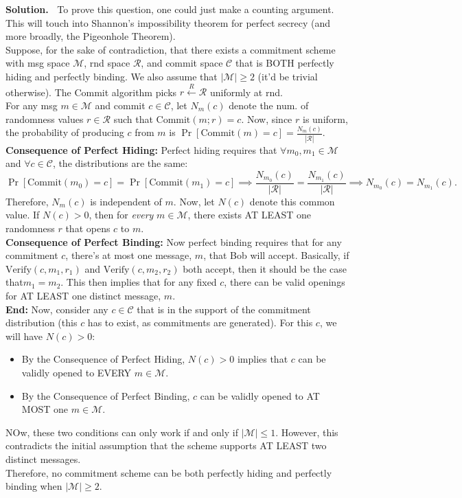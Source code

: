 \documentclass[12pt]{article}
\theoremstyle{definition}
\newcommand{\addbigskip}{\addvspace{\bigskipamount}}
\newenvironment{solution}
     {\addbigskip
      \noindent\color{blue}\textbf{Solution.\ }}
     {\par\addbigskip}
\newenvironment{solution}
     {\comment}
     {\endcomment}
\newcommand{\M}{\mathcal{M}}
\newcommand{\C}{\mathcal{C}}
\begin{document}
\begin{solution}
To prove this question, one could just make a counting argument.
This will touch into Shannon's impossibility theorem for perfect secrecy (and more broadly, the Pigeonhole Theorem).\\

\noindent Suppose, for the sake of contradiction, that there exists a commitment scheme with msg space $\M$, rnd space $\mathcal{R}$, 
and commit space $\C$ that is BOTH perfectly hiding and perfectly binding.
We also assume that $|\M| \ge 2$ (it'd be trivial otherwise).
The Commit algorithm picks $r \xleftarrow{R} \mathcal{R}$ uniformly at rnd.\\

\noindent For any msg $m \in \M$ and commit $c \in \C$, let $N_m(c)$ denote the num. of randomness values $r \in \mathcal{R}$ such that $\text{Commit}(m; r) = c$.
Now, since $r$ is uniform, the probability of producing $c$ from $m$ is $\Pr[\text{Commit}(m) = c] = \frac{N_m(c)}{|\mathcal{R}|}$.\\

\noindent\textbf{Consequence of Perfect Hiding:}
Perfect hiding requires that $\forall m_0, m_1 \in \M$ and $\forall c \in \C$, the distributions are the same:
\[
\Pr[\text{Commit}(m_0) = c] = \Pr[\text{Commit}(m_1) = c] \implies \frac{N_{m_0}(c)}{|\mathcal{R}|} = \frac{N_{m_1}(c)}{|\mathcal{R}|} \implies N_{m_0}(c) = N_{m_1}(c).
\]
Therefore, $N_m(c)$ is independent of $m$.
Now, let $N(c)$ denote this common value.
If $N(c) > 0$, then for \emph{every} $m \in \M$, there exists AT LEAST one randomness $r$ that opens $c$ to $m$.\\

\noindent\textbf{Consequence of Perfect Binding:}
Now perfect binding requires that for any commitment $c$, there's at most one message, $m$, that Bob will accept.
Basically, if $\text{Verify}(c, m_1, r_1)$ and $\text{Verify}(c, m_2, r_2)$ both accept, then it should be the case that$m_1 = m_2$.
This then implies that for any fixed $c$, there can be valid openings for AT LEAST one distinct message, $m$.\\

\noindent\textbf{End:} Now, consider any $c \in \C$ that is in the support of the commitment distribution (this $c$ has to exist, as commitments are generated).
For this $c$, we will have $N(c) > 0$:
\begin{itemize}
  \item By the Consequence of Perfect Hiding, $N(c) > 0$ implies that $c$ can be validly opened to EVERY $m \in \M$. 
  \item By the Consequence of Perfect Binding, $c$ can be validly opened to AT MOST one $m \in \M$.
\end{itemize}
NOw, these two conditions can only work if and only if $|\M| \le 1$.
However, this contradicts the initial assumption that the scheme supports AT LEAST two distinct messages. \\

\noindent Therefore, no commitment scheme can be both perfectly hiding and perfectly binding when $|\M| \ge 2$.
\end{solution}
\end{document}
